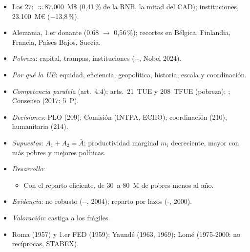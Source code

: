 \documentclass{article}
\begin{document}
\begin{columnas}
\begin{itemize}
\item Los 27: $\approx$87.000~M\$ (0,41\,\% de la RNB, la mitad del CAD); instituciones, 23.100~M€ ($-$13,8\,\%).
\item Alemania, 1.er donante (0,68 $\to$ 0,56\,\%); recortes en Bélgica, Finlandia, Francia, Países Bajos, Suecia.
\end{itemize}
\begin{itemize}
\item \emph{Pobreza}: capital, trampas, instituciones (--, Nobel 2024).
\item \emph{Por qué la UE}: equidad, eficiencia, geopolítica, historia, escala y coordinación.
\item \emph{Competencia paralela} (art.~4.4); arts.~21~TUE y 208~TFUE (pobreza); ; Consenso (2017: 5~P).
\item \emph{Decisiones}: PLO (209); Comisión (INTPA, ECHO); coordinación (210); humanitaria (214).
\end{itemize}
\begin{itemize}
\item \emph{Supuestos}: $A_1+A_2=\bar A$; productividad marginal $m_i$ decreciente, mayor con más pobres y mejores políticas.
\item \emph{Desarrollo}:
  \begin{itemize}
  \item Con el reparto eficiente, de 30~a 80~M de pobres menos al año.
  \end{itemize}
\item \emph{Evidencia}: no robusto (--, 2004); reparto por lazos (-, 2000).
\item \emph{Valoración}: castiga a los frágiles.
\end{itemize}
\begin{itemize}
\item Roma (1957) y 1.er FED (1959); Yaundé (1963, 1969); Lomé (1975-2000: no recíprocas, STABEX).

\end{itemize}
\end{columnas}
\end{document}
